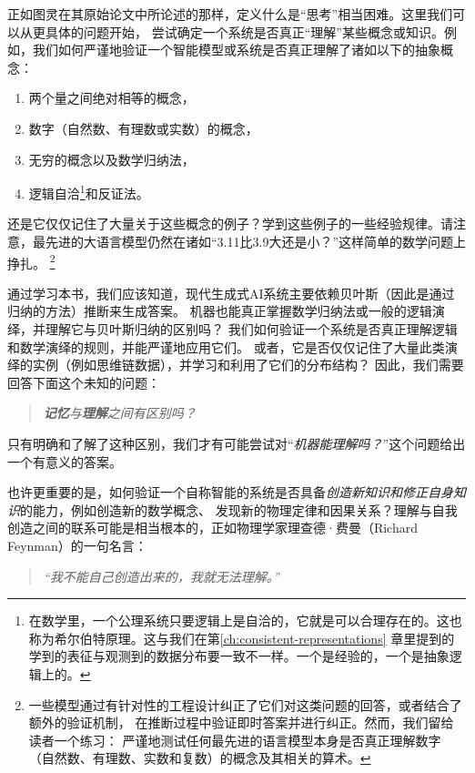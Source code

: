 \documentclass[../../book-main_zh.tex]{subfiles}
\begin{document}
正如图灵在其原始论文中所论述的那样，定义什么是“思考”相当困难。这里我们可以从更具体的问题开始，
尝试确定一个系统是否真正“理解”某些概念或知识。例如，我们如何严谨地验证一个智能模型或系统是否真正理解了诸如以下的抽象概念：
\begin{enumerate}
    \item 两个量之间绝对相等的概念，
    \item 数字（自然数、有理数或实数）的概念，
    \item 无穷的概念以及数学归纳法，
    \item 逻辑自洽\footnote{在数学里，一个公理系统只要逻辑上是自洽的，它就是可以合理存在的。这也称为希尔伯特原理。这与我们在第\ref{ch:consistent-representations}
    章里提到的学到的表征与观测到的数据分布要一致不一样。一个是经验的，一个是抽象逻辑上的。}和反证法。
\end{enumerate}
还是它仅仅记住了大量关于这些概念的例子？学到这些例子的一些经验规律。请注意，最先进的大语言模型仍然在诸如“3.11比3.9大还是小？”这样简单的数学问题上挣扎。
\footnote{一些模型通过有针对性的工程设计纠正了它们对这类问题的回答，或者结合了额外的验证机制，
在推断过程中验证即时答案并进行纠正。然而，我们留给读者一个练习：
严谨地测试任何最先进的语言模型本身是否真正理解数字（自然数、有理数、实数和复数）的概念及其相关的算术。}

通过学习本书，我们应该知道，现代生成式AI系统主要依赖贝叶斯（因此是通过归纳的方法）推断来生成答案。
机器也能真正掌握数学归纳法或一般的逻辑演绎，并理解它与贝叶斯归纳的区别吗？
我们如何验证一个系统是否真正理解逻辑和数学演绎的规则，并能严谨地应用它们。
或者，它是否仅仅记住了大量此类演绎的实例（例如思维链数据），并学习和利用了它们的分布结构？
因此，我们需要回答下面这个未知的问题：
\begin{quote}
    \centering
    \textit{\textbf{记忆}与\textbf{理解}之间有区别吗？}
\end{quote}
只有明确和了解了这种区别，我们才有可能尝试对“{\em 机器能理解吗？}”这个问题给出一个有意义的答案。

也许更重要的是，如何验证一个自称智能的系统是否具备{\em 创造新知识和修正自身知识}的能力，例如创造新的数学概念、
发现新的物理定律和因果关系？理解与自我创造之间的联系可能是相当根本的，正如物理学家理查德·费曼（Richard Feynman）的一句名言：
\begin{quote}
    \centering
    \textit{“我不能自己创造出来的，我就无法理解。”}
\end{quote}
\end{document}
